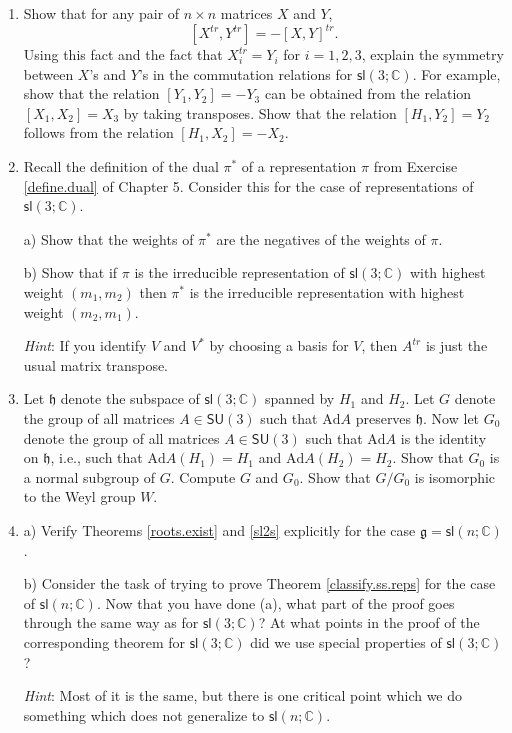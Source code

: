 \documentclass{amsbook}
\let \frak = \mathfrak
\theoremstyle{plain}
\numberwithin{equation}{chapter}
\numberwithin{theorem}{chapter}
\begin{document}
\begin{enumerate}
\item \label{relations.tr}Show that for any pair of $n\times n$ matrices $X$
and $Y$,
\[
\left[  X^{tr},Y^{tr}\right]  =-\left[  X,Y\right]  ^{tr}\text{.}%
\]
Using this fact and the fact that $X_{i}^{tr}=Y_{i}$ for $i=1,2,3$, explain
the symmetry between $X$'s and $Y$'s in the commutation relations for
$\mathsf{sl}\left(  3;\mathbb{C}\right)  $. For example, show that the
relation $\left[  Y_{1},Y_{2}\right]  =-Y_{3}$ can be obtained from the
relation $\left[  X_{1},X_{2}\right]  =X_{3}$ by taking transposes. Show that
the relation $\left[  H_{1},Y_{2}\right]  =Y_{2}$ follows from the relation
$\left[  H_{1},X_{2}\right]  =-X_{2}$.

\item  Recall the definition of the dual $\pi^{\ast}$ of a representation
$\pi$ from Exercise \ref{define.dual} of Chapter 5. Consider this for the case
of representations of $\mathsf{sl}\left(  3;\mathbb{C}\right)  $.

a) Show that the weights of $\pi^{\ast}$ are the negatives of the weights of
$\pi$.

b) Show that if $\pi$ is the irreducible representation of $\mathsf{sl}\left(
3;\mathbb{C}\right)  $ with highest weight $\left(  m_{1},m_{2}\right)  $ then
$\pi^{\ast}$ is the irreducible representation with highest weight $\left(
m_{2},m_{1}\right)  $.

\textit{Hint}: If you identify $V$ and $V^{\ast}$ by choosing a basis for $V$,
then $A^{tr}$ is just the usual matrix transpose.

\item \label{weyl.quotient}Let $\frak{h}$ denote the subspace of
$\mathsf{sl}\left(  3;\mathbb{C}\right)  $ spanned by $H_{1}$ and $H_{2}$. Let
$G$ denote the group of all matrices $A\in\mathsf{SU}(3)$ such that
$\mathrm{Ad}A$ preserves $\frak{h}$. Now let $G_{0}$ denote the group of all
matrices $A\in\mathsf{SU}(3)$ such that $\mathrm{Ad}A$ is the identity on
$\frak{h}$, i.e., such that $\mathrm{Ad}A(H_{1})=H_{1}$ and $\mathrm{Ad}%
A(H_{2})=H_{2}$. Show that $G_{0}$ is a normal subgroup of $G$. Compute $G$
and $G_{0}$. Show that $G/G_{0}$ is isomorphic to the Weyl group $W$.

\item  a) Verify Theorems \ref{roots.exist} and \ref{sl2s} explicitly for the
case $\frak{g}=\mathsf{sl}\left(  n;\mathbb{C}\right)  $.

b) Consider the task of trying to prove Theorem \ref{classify.ss.reps} for the
case of $\mathsf{sl}\left(  n;\mathbb{C}\right)  $. Now that you have done
(a), what part of the proof goes through the same way as for $\mathsf{sl}%
\left(  3;\mathbb{C}\right)  $? At what points in the proof of the
corresponding theorem for $\mathsf{sl}\left(  3;\mathbb{C}\right)  $ did we
use special properties of $\mathsf{sl}\left(  3;\mathbb{C}\right)  $?

\textit{Hint}: Most of it is the same, but there is one critical point which
we do something which does not generalize to $\mathsf{sl}\left(
n;\mathbb{C}\right)  $.
\end{enumerate}
\end{document}
